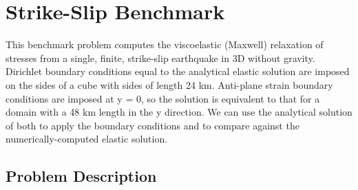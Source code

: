 
\section{\label{sec:benchmarks:strikeslip}Strike-Slip Benchmark}

This benchmark problem computes the viscoelastic (Maxwell) relaxation
of stresses from a single, finite, strike-slip earthquake in 3D without
gravity.  Dirichlet boundary conditions equal to the analytical elastic
solution are imposed on the sides of a cube with sides of length 24
km. Anti-plane strain boundary conditions are imposed at y = 0, so
the solution is equivalent to that for a domain with a 48 km length
in the y direction. We can use the analytical solution of \cite{Okada:1992}
both to apply the boundary conditions and to compare against the numerically-computed
elastic solution.




\subsection{Problem Description}

